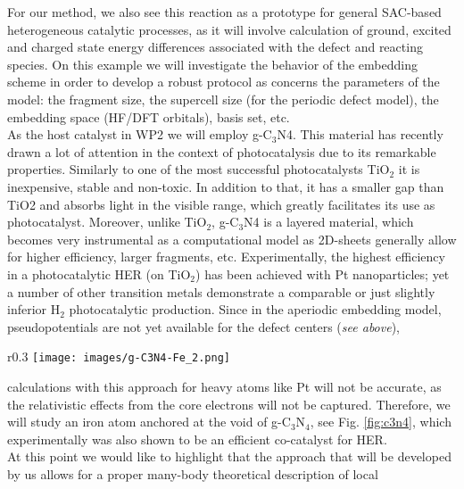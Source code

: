 \documentclass[a4paper,11pt,headings=normal]{scrartcl}
\begin{document}
For our method, we also see this reaction as a prototype for general SAC-based heterogeneous catalytic processes, as it will involve calculation of ground, excited and charged state energy differences associated with the defect and reacting species. On this example we will investigate the behavior of the embedding scheme in order to develop a robust protocol as concerns the parameters of the model: the fragment size, the supercell size (for the periodic defect model), the embedding space (HF/DFT orbitals), basis set, etc.\\
As the host catalyst in WP2 we will employ g-C$_3$N4. This material has recently 
drawn a lot of attention in the context of photocatalysis due to its remarkable 
properties.\autocite{Zhu_2021,Wu_2025} Similarly to one of the most successful 
photocatalysts TiO$_2$ it is inexpensive, stable and non-toxic. In addition to 
that, it has a smaller gap than TiO2 and absorbs light in the visible range, which 
greatly facilitates its use as photocatalyst. Moreover, unlike TiO$_2$,  g-C$_3$N4 
is a layered material, which becomes very instrumental as a computational model as 
2D-sheets generally allow for higher efficiency, larger fragments, etc. 
Experimentally, the highest efficiency in a photocatalytic HER (on TiO$_2$) has 
been achieved with Pt nanoparticles; yet a number of other transition metals 
demonstrate a comparable or just slightly inferior H$_2$ photocatalytic 
production.\autocite{Wu_2025} Since in the aperiodic embedding model, 
pseudopotentials are not yet available for the defect centers (\textit{see above}),
\begin{wrapfigure}{r}{0.3\textwidth}
	\centering
	\texttt{[image: images/g-C3N4-Fe\_2.png]}
		\caption{A corrugated g-C$_3$N$_4$ layer\autocite{Gracia_2009} with an iron atom anchored in none of the voids. The exact position of the iron atom and the local structure rearrangement are yet to be determined.}
	  \label{fig:c3n4}
\vspace{-1.em}
\end{wrapfigure}calculations with this approach for heavy atoms like Pt will not 
be accurate, as the relativistic effects from the core electrons will not be 
captured. Therefore, we will study an iron atom anchored at the 
void of g-C$_3$N$_4$, see Fig. \ref{fig:c3n4}, which experimentally was also shown 
to be an efficient co-catalyst for HER.\autocite{Zhang_2019}\\
At this point we would like to highlight that the approach that will be developed 
by us allows for a proper many-body theoretical description of local 
\end{document}

